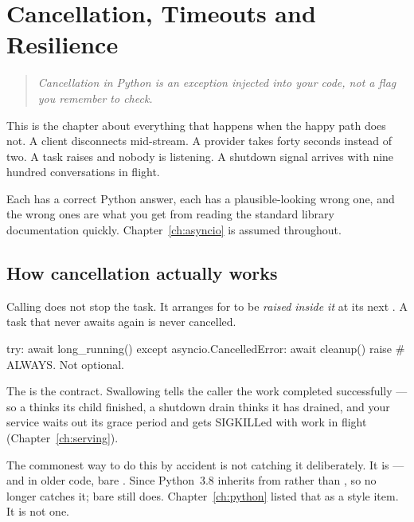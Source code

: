 \chapter{Cancellation, Timeouts and Resilience}
\label{ch:cancellation}

\begin{quote}\itshape
Cancellation in Python is an exception injected into your code, not a flag you
remember to check.
\end{quote}

\noindent
This is the chapter about everything that happens when the happy path does not. A
client disconnects mid-stream. A provider takes forty seconds instead of two. A
task raises and nobody is listening. A shutdown signal arrives with nine hundred
conversations in flight.

Each has a correct Python answer, each has a plausible-looking wrong one, and the
wrong ones are what you get from reading the standard library documentation
quickly. Chapter~\ref{ch:asyncio} is assumed throughout.

\section{How cancellation actually works}
\label{sec:cancellation}


Calling  does not stop the task. It arranges for
 to be \emph{raised inside it} at its next . A
task that never awaits again is never cancelled.

\begin{python}[caption={The only correct shape}, label={lst:cancel-shape}]
try:
    await long_running()
except asyncio.CancelledError:
    await cleanup()
    raise                    # ALWAYS. Not optional.
\end{python}

\begin{warning}
The  is the contract. Swallowing  tells the
caller the work completed successfully --- so a  thinks its child
finished, a shutdown drain thinks it has drained, and your service waits out its
grace period and gets SIGKILLed with work in flight
(Chapter~\ref{ch:serving}).

The commonest way to do this by accident is not catching it deliberately. It is
 --- and in older code, bare . Since
Python~3.8  inherits from  rather than
, so  no longer catches it; bare
 still does. Chapter~\ref{ch:python} listed that as a style item.
It is not one.
\end{warning}

